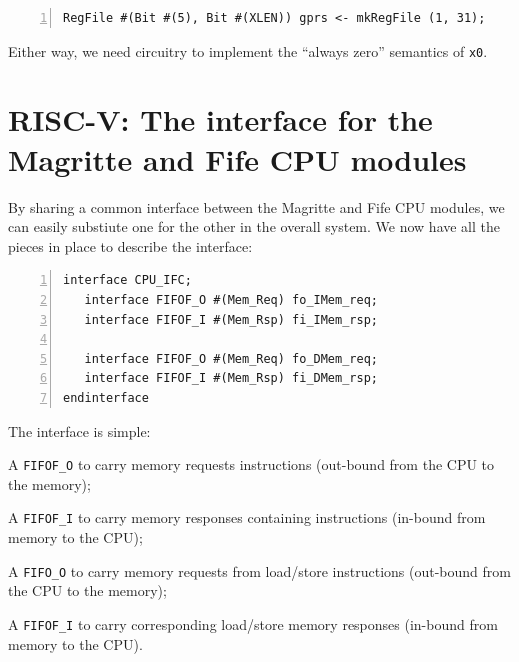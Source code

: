 \begin{Verbatim}[frame=single, numbers=left]
   RegFile #(Bit #(5), Bit #(XLEN)) gprs <- mkRegFile (1, 31);
\end{Verbatim}

Either way, we need circuitry to implement the ``always zero''
semantics of \verb|x0|.


\section{RISC-V: The interface for the Magritte and Fife CPU modules}

\label{Sec_CPU_Module_Skeleton_CPU_interface}

By sharing a common interface between the Magritte and Fife CPU
modules, we can easily substiute one for the other in the overall
system.  We now have all the pieces in place to describe the interface:


\begin{Verbatim}[frame=single, numbers=left]
interface CPU_IFC;
   interface FIFOF_O #(Mem_Req) fo_IMem_req;
   interface FIFOF_I #(Mem_Rsp) fi_IMem_rsp;

   interface FIFOF_O #(Mem_Req) fo_DMem_req;
   interface FIFOF_I #(Mem_Rsp) fi_DMem_rsp;
endinterface
\end{Verbatim}

The interface is simple:

\begin{tightlist}

\item A \verb|FIFOF_O| to carry memory requests instructions (out-bound
from the CPU to the memory);

\item A \verb|FIFOF_I| to carry memory responses containing
instructions (in-bound from memory to the CPU);

\item A \verb|FIFO_O| to carry memory requests from load/store
instructions (out-bound from the CPU to the memory);

\item A \verb|FIFOF_I| to carry corresponding load/store memory
responses (in-bound from memory to the CPU).

\end{tightlist}

